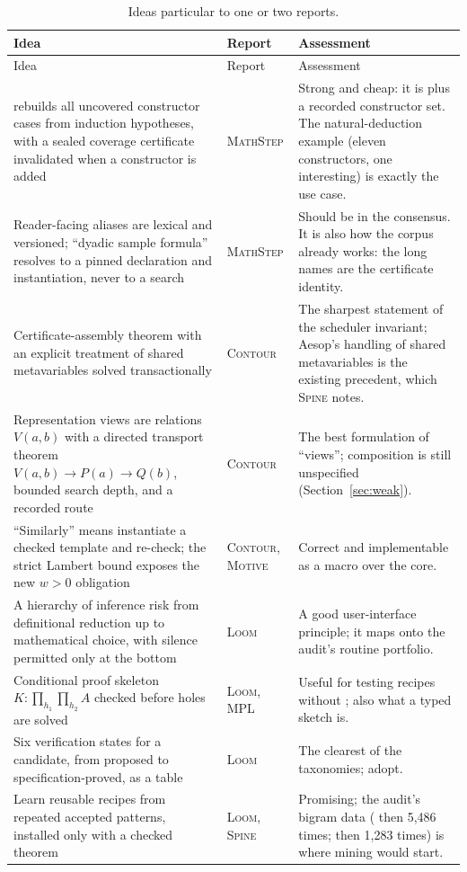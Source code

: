 \documentclass[11pt,a4paper]{article}
\newcommand{\code}[1]{\texttt{\detokenize{#1}}}
\newcommand{\MS}{\textsc{MathStep}}
\newcommand{\Co}{\textsc{Contour}}
\newcommand{\Lo}{\textsc{Loom}}
\newcommand{\ML}{\textsc{MPL}}
\newcommand{\Mv}{\textsc{Motive}}
\newcommand{\Sp}{\textsc{Spine}}
\theoremstyle{definition}
\begin{document}
\begingroup\small
\begin{longtable}{@{}L{.36\textwidth}L{.09\textwidth}L{.49\textwidth}@{}}
\caption{Ideas particular to one or two reports.}\label{tab:unique}\\
\toprule
Idea & Report & Assessment\\
\midrule
\endfirsthead
\toprule
Idea & Report & Assessment\\
\midrule
\endhead
\code{remaining =>} rebuilds all uncovered constructor cases from induction hypotheses, with a sealed coverage certificate invalidated when a constructor is added & \MS & Strong and cheap: it is \code{cases} plus a recorded constructor set. The natural-deduction example (eleven constructors, one interesting) is exactly the use case.\\
Reader-facing aliases are lexical and versioned; ``dyadic sample formula'' resolves to a pinned declaration and instantiation, never to a search & \MS & Should be in the consensus. It is also how the corpus already works: the long names are the certificate identity.\\
Certificate-assembly theorem with an explicit treatment of shared metavariables solved transactionally & \Co & The sharpest statement of the scheduler invariant; Aesop's handling of shared metavariables is the existing precedent, which \Sp{} notes.\\
Representation views are relations $V(a,b)$ with a directed transport theorem $V(a,b) \to P(a) \to Q(b)$, bounded search depth, and a recorded route & \Co & The best formulation of ``views''; composition is still unspecified (Section~\ref{sec:weak}).\\
``Similarly'' means instantiate a checked template and re-check; the strict Lambert bound exposes the new $w>0$ obligation & \Co, \Mv & Correct and implementable as a macro over the core.\\
A hierarchy of inference risk from definitional reduction up to mathematical choice, with silence permitted only at the bottom & \Lo & A good user-interface principle; it maps onto the audit's routine portfolio.\\
Conditional proof skeleton $K : \prod_{h_1}\prod_{h_2} A$ checked before holes are solved & \Lo, \ML & Useful for testing recipes without \code{sorry}; also what a typed sketch is.\\
Six verification states for a candidate, from proposed to specification-proved, as a table & \Lo & The clearest of the taxonomies; adopt.\\
Learn reusable recipes from repeated accepted patterns, installed only with a checked theorem & \Lo, \Sp & Promising; the audit's bigram data (\code{have} then \code{rw} 5,486 times; \code{rw} then \code{ring} 1,283 times) is where mining would start.\\

\end{longtable}
\end{document}

